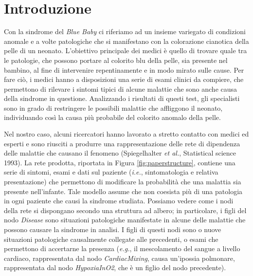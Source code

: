 \chapter{Introduzione}
Con la sindrome del \textit{Blue Baby} ci riferiamo ad un insieme variegato di condizioni anomale e a volte patologiche che si manifestano con la colorazione cianotica della pelle di un neonato.
L'obiettivo principale dei medici è quello di trovare quale tra le patologie, che possono portare al colorito blu della pelle, sia presente nel bambino, al fine di intervenire repentinamente e in modo mirato sulle cause. Per fare ciò, i medici hanno a disposizioni una serie di esami clinici da compiere, che permettono di rilevare i sintomi tipici di alcune malattie che sono anche causa della sindrome in questione. Analizzando i risultati di questi test, gli specialisti sono in grado di restringere le possibili malattie che affliggono il neonato, individuando così la causa più probabile del colorito anomalo della pelle.

Nel nostro caso, alcuni ricercatori hanno lavorato a stretto contatto con medici ed esperti e sono riusciti a produrre una rappresentazione delle rete di dipendenza delle malattie che causano il fenomeno (Spiegelhalter \textit{et al.}, Statistical science 1993). La rete prodotta, riportata in Figura \ref{fig:paperstructure}, contiene una serie di sintomi, esami e dati sul paziente (\textit{i.e.}, sintomatologia e relativa presentazione) che permettono di modificare la probabilità che una malattia sia presente nell'infante. Tale modello assume che non coesista più di una patologia in ogni paziente che causi la sindrome studiata. Possiamo vedere come i nodi della rete si dispongano secondo una struttura ad albero; in particolare, i figli del nodo \textit{Disease} sono situazioni patologiche manifestate in alcune delle malattie che possono causare la sindrome in analisi. I figli di questi nodi sono o nuove situazioni patologiche causalmente collegate alle precedenti, o esami che permettono di accertarne la presenza (\textit{e.g.}, il mescolamento del sangue a livello cardiaco, rappresentata dal nodo \textit{CardiacMixing}, causa un'ipossia polmonare, rappresentata dal nodo \textit{HypoxiaInO2}, che è un figlio del nodo precedente).
 
